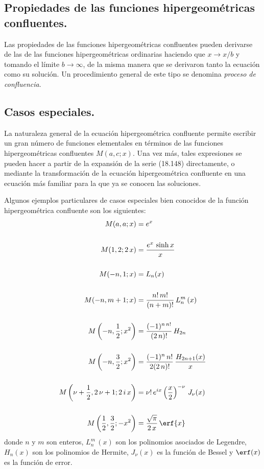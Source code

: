 \subsection{Propiedades de las funciones hipergeométricas confluentes.}

Las propiedades de las funciones hipergeométricas confluentes pueden derivarse de las de las funciones hipergeométricas ordinarias haciendo que $x \to x/b$ y tomando el límite $b \to \infty$, de la misma manera que se derivaron tanto la ecuación como su solución. Un procedimiento general de este tipo se denomina \emph{proceso de confluencia}.

\subsection{Casos especiales.}

La naturaleza general de la ecuación hipergeométrica confluente permite escribir un gran número de funciones elementales en términos de las funciones hipergeométricas confluentes $M (a, c; x)$. Una vez más, tales expresiones se pueden hacer a partir de la expansión de la serie (18.148) directamente, o mediante la transformación de la ecuación hipergeométrica confluente en una ecuación más familiar para la que ya se conocen las soluciones.
\par
Algunos ejemplos particulares de casos especiales bien conocidos de la función hipergeométrica confluente son los siguientes:
\begin{align*}
M(a, a; x) &= e^{x} \\[1.5em]
M(1, 2; 2 \, x) &= \dfrac{e^{x} \, \sinh x}{x} \\[1.5em]
M(-n, 1; x) &= L_{n} (x) \\[1.5em]
M(-n, m + 1; x) &= \dfrac{n! \, m!}{(n + m)!} \, L_{n}^{m} \, (x) \\[1.5em]
M \left( -n, \dfrac{1}{2}; x^{2} \right) &= \dfrac{(-1)^{n \, n!}}{(2 \, n)!} \, H_{2n} \\[1.5em]
M \left( -n, \dfrac{3}{2}; x^{2} \right) &= \dfrac{(-1)^{n} \, n!}{2 (2 \, n)!} \, \dfrac{H_{2n+1} (x)}{x} \\[1.5em]
M \left(\nu + \dfrac{1}{2}, 2 \, \nu + 1; 2 \, i \, x \right) &= \nu! \, e^{i x} \left( \dfrac{x}{2} \right)^{-\nu} \, J_{\nu} (x) \\[1.5em]
M \left( \dfrac{1}{2}, \dfrac{3}{2}; -x^{2} \right) &= \dfrac{\sqrt{\pi}}{2 \, x} \, \erf{x}
\end{align*}
donde $n$ y $m$ son enteros, $L_{n}^{m} \, (x)$ son los polinomios asociados de Legendre, $H_{n}(x)$ son los polinomios de Hermite, $J_{\nu} (x)$ es la función de Bessel y $\erf (x)$ es la función de error.

